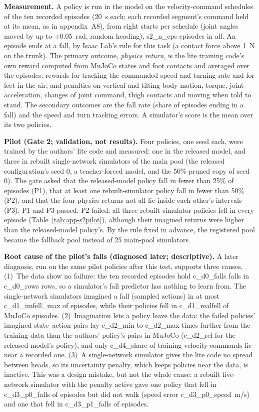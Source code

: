 \textbf{Measurement.} A policy is run in the model on the velocity-command schedules of the ten recorded episodes
(20~s each; each recorded segment's command held at its mean, as in appendix~A8), from eight starts per schedule
(joint angles moved by up to $\pm$0.05~rad, random heading), {{s2_n_eps}} episodes in all. An episode ends at a fall,
by Isaac Lab's rule for this task (a contact force above 1~N on the trunk). The primary outcome, \emph{physics
return}, is the lite training code's own reward computed from MuJoCo states and foot contacts and averaged over the
episodes: rewards for tracking the commanded speed and turning rate and for feet in the air, and penalties on
vertical and tilting body motion, torque, joint acceleration, changes of joint command, thigh contacts and moving
when told to stand. The secondary outcomes are the fall rate (share of episodes ending in a fall) and the speed and
turn tracking errors. A simulator's score is the mean over its two policies.

\textbf{Pilot (Gate 2; validation, not results).} Four policies, one seed each, were trained by the authors' lite
code and measured: one in the released model, and three in rebuilt single-network simulators of the main pool (the
released configuration's seed 0, a teacher-forced model, and the 50\%-pruned copy of seed 0). The gate asked that the
released-model policy fall in fewer than 25\% of episodes (P1), that at least one rebuilt-simulator policy fall in
fewer than 50\% (P2), and that the four physics returns not all lie inside each other's intervals (P3). P1 and P3
passed. P2 failed: all three rebuilt-simulator policies fell in every episode (Table~\ref{tab:app-s2pilot}), although
their imagined returns were higher than the released-model policy's. By the rule fixed in advance, the registered pool
became the fallback pool instead of 25 main-pool simulators.

\textbf{Root cause of the pilot's falls (diagnosed later; descriptive).} A later diagnosis, run on the same pilot
policies after this test, supports three causes. (1)~The data show no failure: the ten recorded episodes hold
{{c_d0_falls}} falls in {{c_d0_rows}} rows, so a simulator's fall predictor has nothing to learn from. The
single-network simulators imagined a fall (sampled actions) in at most {{c_d1_imfell_max}} of episodes, while their policies fell in
{{c_d1_realfell}} of MuJoCo episodes. (2)~Imagination lets a policy leave the data: the failed policies' imagined
state--action pairs lay {{c_d2_min}} to {{c_d2_max}} times further from the training data than the authors' policy's
pairs in MuJoCo ({{c_d2_rel}} for the released model's policy), and only {{c_d4_share}} of training velocity commands
lie near a recorded one. (3)~A single-network simulator gives the lite code no spread between heads, so its
uncertainty penalty, which keeps policies near the data, is inactive. This was a design mistake, but not the whole
cause: a rebuilt five-network simulator with the penalty active gave one policy that fell in {{c_d3_p0_falls}} of episodes
but did not walk (speed error {{c_d3_p0_speed}}~m/s) and one that fell in {{c_d3_p1_falls}} of episodes.

